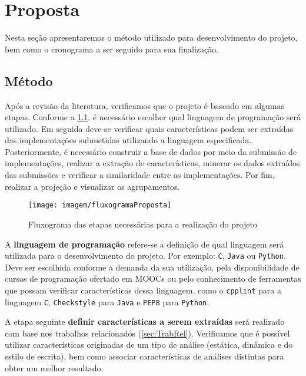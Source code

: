 \chapter{Proposta}
\label{chap:Proposta}

	Nesta seção apresentaremos o método utilizado para desenvolvimento do projeto, bem
	como o cronograma a ser seguido para sua finalização.

	\section{Método}
	Após a revisão da literatura, verificamos que o projeto é baseado em algumas etapas.
	Conforme a \cref{fig:fluxogramaProposta}, é necessário escolher qual linguagem de programação
	será utilizado. Em seguida deve-se verificar quais características podem ser extraídas
	das implementações submetidas utilizando a linguagem especificada. Posteriormente, é
	necessário construir a base de dados por meio da submissão de implementações, realizar
	a extração de características, minerar os dados extraídos das submissões e verificar a
	similaridade entre as implementações. Por fim, realizar a projeção e visualizar os
	agrupamentos.

	\begin{figure}[h]
		\centering
		\texttt{[image: imagem/fluxogramaProposta]}
		\captionsetup{justification=centering}
		\caption{Fluxograma das etapas necessárias para a realização do projeto}
		\label{fig:fluxogramaProposta}
	\end{figure}

	A \textbf{linguagem de programação} refere-se a definição de qual linguagem será
	utilizada para o desenvolvimento do projeto. Por exemplo: \texttt{C}, \texttt{Java}
	ou \texttt{Python}. Deve ser escolhida conforme a demanda da sua utilização, pela
	disponibilidade de cursos de programação ofertado em MOOCs ou pelo conhecimento de
	ferramentas que possam verificar características dessa linguagem, como o
	\texttt{cpplint} para a linguagem \texttt{C}, \texttt{Checkstyle} para
	\texttt{Java} e \texttt{PEP8} para \texttt{Python}.

	A etapa seguinte \textbf{definir características a serem extraídas} será realizado
	com base nos trabalhos relacionados (\cref{sec:TrabRel}). Verificamos que é
	possível utilizar características originadas de um tipo de análise (estática,
	dinâmica e do estilo de escrita), bem como associar características de análises
	distintas para obter um melhor resultado.
	

